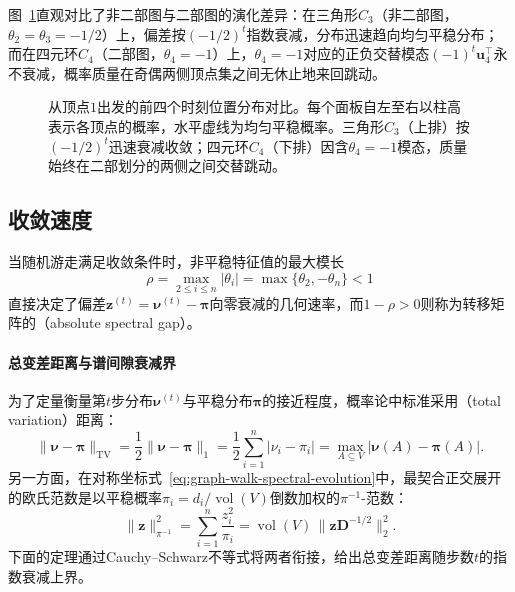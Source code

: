 图~\ref{fig:graph-walk-parity}直观对比了非二部图与二部图的演化差异：在三角形$C_3$（非二部图，$\theta_2=\theta_3=-1/2$）上，偏差按$(-1/2)^t$指数衰减，分布迅速趋向均匀平稳分布；而在四元环$C_4$（二部图，$\theta_4=-1$）上，$\theta_4=-1$对应的正负交替模态$(-1)^t\bm u_4^\top$永不衰减，概率质量在奇偶两侧顶点集之间无休止地来回跳动。

\begin{figure}[!htb]
\centering

\caption{从顶点$1$出发的前四个时刻位置分布对比。每个面板自左至右以柱高表示各顶点的概率，水平虚线为均匀平稳概率。三角形$C_3$（上排）按$(-1/2)^t$迅速衰减收敛；四元环$C_4$（下排）因含$\theta_4=-1$模态，质量始终在二部划分的两侧之间交替跳动。}
\label{fig:graph-walk-parity}
\end{figure}

\subsection{收敛速度}
\label{sec:graph-walk-lazy}

当随机游走满足收敛条件时，非平稳特征值的最大模长
\[
  \rho = \max_{2\leq i\leq n}|\theta_i| = \max\{\theta_2, -\theta_n\} < 1
\]
直接决定了偏差$\bm z^{(t)}=\bm\nu^{(t)}-\bm\pi$向零衰减的几何速率，而$1-\rho>0$则称为转移矩阵的（absolute spectral gap）。

\paragraph{总变差距离与谱间隙衰减界}

为了定量衡量第$t$步分布$\bm\nu^{(t)}$与平稳分布$\bm\pi$的接近程度，概率论中标准采用（total variation）距离：
\[
  \lVert\bm\nu-\bm\pi\rVert_{\mathrm{TV}}
  =\frac12\lVert\bm\nu-\bm\pi\rVert_1
  =\frac12\sum_{i=1}^n|\nu_i-\pi_i|
  =\max_{A\subseteq V}\bigl|\bm\nu(A)-\bm\pi(A)\bigr|.
\]
另一方面，在对称坐标式~\eqref{eq:graph-walk-spectral-evolution}中，最契合正交展开的欧氏范数是以平稳概率$\pi_i=d_i/\operatorname{vol}(V)$倒数加权的$\pi^{-1}$-范数：
\[
\lVert\bm{z}\rVert_{\pi^{-1}}^2
=\sum_{i=1}^n\frac{z_i^2}{\pi_i}
=\operatorname{vol}(V)\,\lVert\bm{z}\bm{D}^{-1/2}\rVert_2^2.
\]
下面的定理通过Cauchy--Schwarz不等式将两者衔接，给出总变差距离随步数$t$的指数衰减上界。

